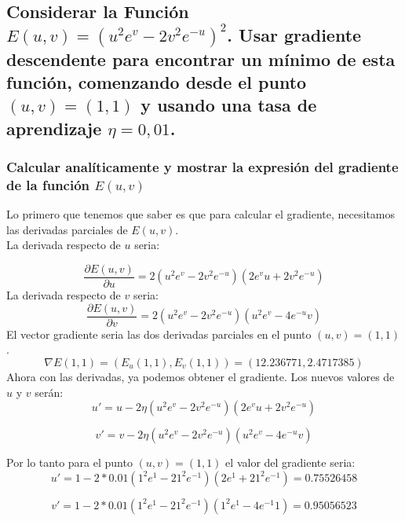 \documentclass[12pt,a4paper]{article}
\begin{document}
\subsection{Considerar la Función \(  E(u, v) = (u^2e^v - 2v^2e^{-u})^2\). Usar gradiente descendente para encontrar un mínimo de esta función, comenzando desde el punto \((u, v) = (1, 1)\) y usando una tasa de aprendizaje \(\eta = 0,01\).}
\subsubsection{Calcular analíticamente y mostrar la expresión del gradiente de la función \(E(u, v)\)}
Lo primero que tenemos que saber es que para calcular el gradiente, necesitamos las derivadas parciales de \(E(u,v)\). \\
La derivada respecto de \(u\) seria: 

\begin{equation}
\frac{\partial E(u,v)}
{\partial u} = 2\left(u^2e^v-2v^2e^{-u}\right)\left(2e^vu+2v^2e^{-u}\right)
\end{equation}
La derivada respecto de \(v\) seria: 
\begin{equation}
\frac{\partial E(u,v)}
{\partial v} = 2\left(u^2e^v-2v^2e^{-u}\right)\left(u^2e^v-4e^{-u}v\right)
\end{equation}
El vector gradiente seria las dos derivadas parciales en el punto  $(u, v) = (1, 1)$.
\begin{equation}
\nabla E(1,1) = (E_u(1,1),E_v(1,1)) = (12.236771,2.4717385)
\end{equation}
Ahora con las derivadas, ya podemos obtener el gradiente. Los nuevos valores de \(u\) y \(v\) serán:
\begin{equation}
u' = u - 2\eta\left(u^2e^v-2v^2e^{-u}\right)\left(2e^vu+2v^2e^{-u}\right)
\end{equation}

\begin{equation}
v' = v - 2\eta\left(u^2e^v-2v^2e^{-u}\right)\left(u^2e^v-4e^{-u}v\right)
\end{equation}

Por lo tanto para el punto $(u, v) = (1, 1)$ el valor del gradiente seria:
\begin{equation}
u' = 1 - 2*0.01\left(1^2e^1-21^2e^{-1}\right)\left(2e^1+21^2e^{-1}\right) = 0.75526458
\end{equation}

\begin{equation}
v' = 1 - 2*0.01\left(1^2e^1-21^2e^{-1}\right)\left(1^2e^1-4e^{-1}1\right) = 0.95056523
\end{equation}
\end{document}
